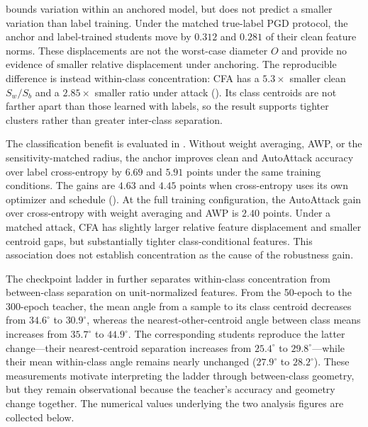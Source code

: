  bounds variation within an anchored model, but does not predict a smaller
variation than label training. Under the matched true-label PGD protocol, the anchor and
label-trained students move by $0.312$ and $0.281$ of their clean feature norms. These
displacements are not the worst-case diameter $O$ and provide no evidence of smaller relative
displacement under anchoring. The reproducible difference is instead within-class concentration:
CFA has a $5.3\times$ smaller clean $S_w/S_b$ and a $2.85\times$ smaller ratio under attack
(). Its class centroids are not farther apart than those learned with labels,
so the result supports tighter clusters rather than greater inter-class separation.



The classification benefit is evaluated in . Without weight averaging, AWP,
or the sensitivity-matched radius, the anchor improves clean and AutoAttack accuracy over label
cross-entropy by $6.69$ and $5.91$ points under the same training conditions. The gains are $4.63$
and $4.45$ points when cross-entropy uses its own optimizer and schedule
(). At the full training configuration, the AutoAttack gain
over cross-entropy with weight averaging and AWP is $2.40$ points. Under a matched attack, CFA has
slightly larger relative feature displacement and smaller centroid gaps, but substantially tighter
class-conditional features. This association does not establish concentration as the cause of the
robustness gain.

The checkpoint ladder in  further separates within-class concentration from
between-class separation on unit-normalized features. From the 50-epoch to the 300-epoch teacher,
the mean angle from a sample to its class centroid decreases from $34.6^\circ$ to $30.9^\circ$,
whereas the nearest-other-centroid angle between class means increases from $35.7^\circ$ to $44.9^\circ$. The
corresponding students reproduce the latter change---their nearest-centroid separation increases from
$25.4^\circ$ to $29.8^\circ$---while their mean within-class angle remains nearly unchanged
($27.9^\circ$ to $28.2^\circ$). These measurements motivate interpreting the ladder through
between-class geometry, but they remain observational because the teacher's accuracy and geometry
change together. The numerical values underlying the two analysis figures are collected below.

